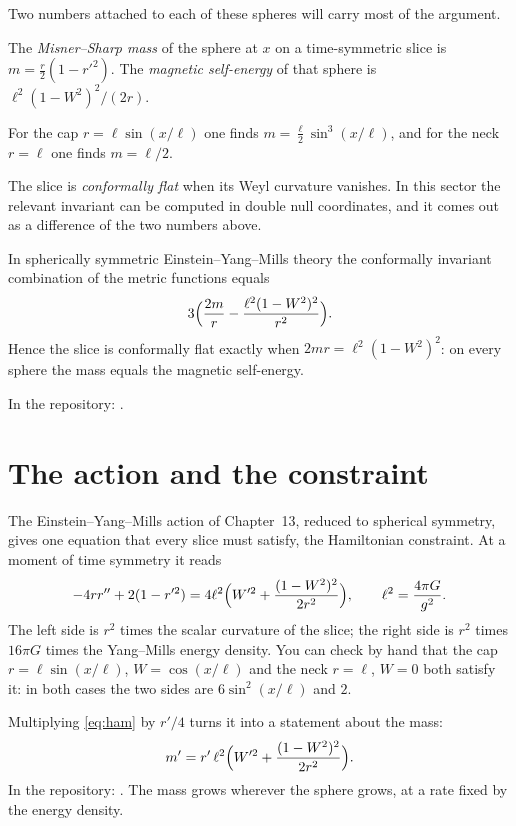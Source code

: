Two numbers attached to each of these spheres will carry most of the argument.

\begin{definition}
The \emph{Misner--Sharp mass} of the sphere at $x$ on a time-symmetric slice is $m=\tfrac r2(1-r'^2)$.
The \emph{magnetic self-energy} of that sphere is $\ell^2(1-W^2)^2/(2r)$.
\end{definition}

For the cap $r=\ell\sin(x/\ell)$ one finds $m=\tfrac\ell2\sin^3(x/\ell)$, and for the neck $r=\ell$ one finds $m=\ell/2$.

The slice is \emph{conformally flat} when its Weyl curvature vanishes. In this sector the relevant invariant can be computed in double null coordinates, and it comes out as a difference of the two numbers above.

\begin{proposition}[Weyl curvature = mass $-$ self-energy]\proved\label{prop:weyl}
In spherically symmetric Einstein--Yang--Mills theory the conformally invariant combination of the metric functions equals
\[
3\Bigl(\frac{2m}{r}-\frac{\ell^2(1-W^2)^2}{r^2}\Bigr).
\]
Hence the slice is conformally flat exactly when $2mr=\ell^2(1-W^2)^2$: on every sphere the mass equals the magnetic self-energy.
\end{proposition}
\noindent In the repository: .

\section{The action and the constraint}

The Einstein--Yang--Mills action of Chapter~13, reduced to spherical symmetry, gives one equation that every slice must satisfy, the Hamiltonian constraint. At a moment of time symmetry it reads
\begin{equation}\label{eq:ham}
-4rr''+2(1-r'^2)=4\ell^2\Bigl(W'^2+\frac{(1-W^2)^2}{2r^2}\Bigr),\qquad \ell^2=\frac{4\pi G}{g^2}.
\end{equation}
The left side is $r^2$ times the scalar curvature of the slice; the right side is $r^2$ times $16\pi G$ times the Yang--Mills energy density. You can check by hand that the cap $r=\ell\sin(x/\ell)$, $W=\cos(x/\ell)$ and the neck $r=\ell$, $W=0$ both satisfy it: in both cases the two sides are $6\sin^2(x/\ell)$ and $2$.

Multiplying \eqref{eq:ham} by $r'/4$ turns it into a statement about the mass:
\begin{equation}\label{eq:massprime}
m'=r'\,\ell^2\Bigl(W'^2+\frac{(1-W^2)^2}{2r^2}\Bigr).
\end{equation}
\noindent In the repository: . The mass grows wherever the sphere grows, at a rate fixed by the energy density.

